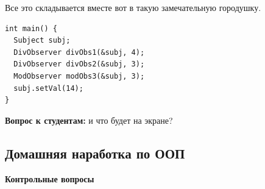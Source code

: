 \documentclass[a4paper,12pt,oneside]{article}
\newif\ifanswers
\begin{document}
Все это складывается вместе вот в такую замечательную городушку.

\begin{lstlisting}
int main() {
  Subject subj;
  DivObserver divObs1(&subj, 4);
  DivObserver divObs2(&subj, 3);
  ModObserver modObs3(&subj, 3);
  subj.setVal(14);
}
\end{lstlisting}

\textbf{Вопрос к студентам:} и что будет на экране?

\ifanswers
Правильный ответ: частное от деления 14 на 4 это 3, на 3 это 4 и в обоих случаях 2 в остатке. Так что 3, 4, 2.
\fi

\pagebreak
\subsection{Домашняя наработка по ООП}

\textbf{Контрольные вопросы}
\end{document}
